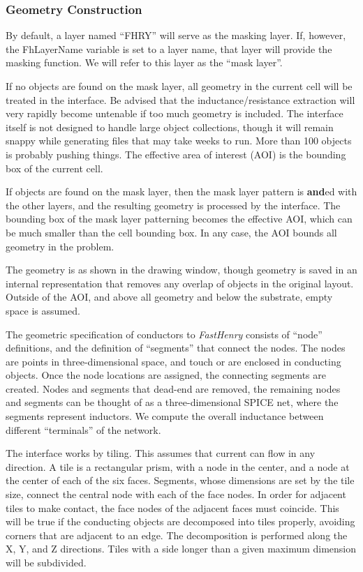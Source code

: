 \subsubsection{Geometry Construction}

By default, a layer named ``{\vt FHRY}'' will serve as the masking
layer.  If, however, the {\et FhLayerName} variable is set to a layer
name, that layer will provide the masking function.  We will refer to
this layer as the ``mask layer''.

If no objects are found on the mask layer, all geometry in the current
cell will be treated in the interface.  Be advised that the
inductance/resistance extraction will very rapidly become untenable if
too much geometry is included.  The interface itself is not designed
to handle large object collections, though it will remain snappy while
generating files that may take weeks to run.  More than 100 objects is
probably pushing things.  The effective area of interest (AOI) is the
bounding box of the current cell.

If objects are found on the mask layer, then the mask layer pattern is
{\bf and}ed with the other layers, and the resulting geometry is
processed by the interface.  The bounding box of the mask layer
patterning becomes the effective AOI, which can be much smaller than
the cell bounding box.  In any case, the AOI bounds all geometry in
the problem.

The geometry is as shown in the drawing window, though geometry is
saved in an internal representation that removes any overlap of
objects in the original layout.  Outside of the AOI, and above all
geometry and below the substrate, empty space is assumed.

The geometric specification of conductors to {\it FastHenry} consists
of ``node'' definitions, and the definition of ``segments'' that
connect the nodes.  The nodes are points in three-dimensional space,
and touch or are enclosed in conducting objects.  Once the node
locations are assigned, the connecting segments are created.  Nodes
and segments that dead-end are removed, the remaining nodes and
segments can be thought of as a three-dimensional SPICE net, where the
segments represent inductors.  We compute the overall inductance
between different ``terminals'' of the network.

The interface works by tiling.  This assumes that current can flow in
any direction.  A tile is a rectangular prism, with a node in the
center, and a node at the center of each of the six faces.  Segments,
whose dimensions are set by the tile size, connect the central node
with each of the face nodes.  In order for adjacent tiles to make
contact, the face nodes of the adjacent faces must coincide.  This
will be true if the conducting objects are decomposed into tiles
properly, avoiding corners that are adjacent to an edge.  The
decomposition is performed along the X, Y, and Z directions.  Tiles
with a side longer than a given maximum dimension will be subdivided.

